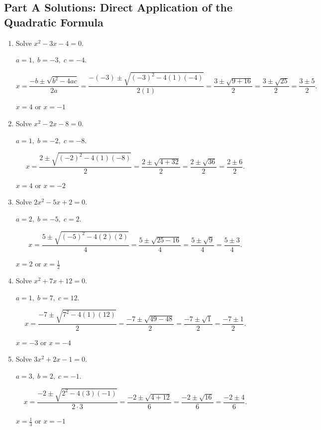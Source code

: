 \documentclass[14pt]{extarticle}
\begin{document}
\subsection*{Part A Solutions: Direct Application of the Quadratic Formula}
\begin{enumerate}
  \item Solve \(x^2 - 3x - 4 = 0.\)

  \(a = 1,\; b = -3,\; c = -4.\)

  \[
  x = \frac{-b \pm \sqrt{b^2 - 4ac}}{2a}
  = \frac{-(-3) \pm \sqrt{(-3)^2 - 4(1)(-4)}}{2(1)}
  = \frac{3 \pm \sqrt{9 + 16}}{2}
  = \frac{3 \pm \sqrt{25}}{2}
  = \frac{3 \pm 5}{2}.
  \]

  \(\boxed{x = 4 \text{ or } x = -1}\)

  \item Solve \(x^2 - 2x - 8 = 0.\)

  \(a = 1,\; b = -2,\; c = -8.\)

  \[
  x = \frac{2 \pm \sqrt{(-2)^2 - 4(1)(-8)}}{2}
  = \frac{2 \pm \sqrt{4 + 32}}{2}
  = \frac{2 \pm \sqrt{36}}{2}
  = \frac{2 \pm 6}{2}.
  \]

  \(\boxed{x = 4 \text{ or } x = -2}\)

  \item Solve \(2x^2 - 5x + 2 = 0.\)

  \(a = 2,\; b = -5,\; c = 2.\)

  \[
  x = \frac{5 \pm \sqrt{(-5)^2 - 4(2)(2)}}{4}
  = \frac{5 \pm \sqrt{25 - 16}}{4}
  = \frac{5 \pm \sqrt{9}}{4}
  = \frac{5 \pm 3}{4}.
  \]

  \(\boxed{x = 2 \text{ or } x = \tfrac{1}{2}}\)

  \item Solve \(x^2 + 7x + 12 = 0.\)

  \(a = 1,\; b = 7,\; c = 12.\)

  \[
  x = \frac{-7 \pm \sqrt{7^2 - 4(1)(12)}}{2}
  = \frac{-7 \pm \sqrt{49 - 48}}{2}
  = \frac{-7 \pm \sqrt{1}}{2}
  = \frac{-7 \pm 1}{2}.
  \]

  \(\boxed{x = -3 \text{ or } x = -4}\)

  \item Solve \(3x^2 + 2x - 1 = 0.\)

  \(a = 3,\; b = 2,\; c = -1.\)

  \[
  x = \frac{-2 \pm \sqrt{2^2 - 4(3)(-1)}}{2 \cdot 3}
  = \frac{-2 \pm \sqrt{4 + 12}}{6}
  = \frac{-2 \pm \sqrt{16}}{6}
  = \frac{-2 \pm 4}{6}.
  \]

  \(\boxed{x = \tfrac{1}{3} \text{ or } x = -1}\)
\end{enumerate}
\end{document}

